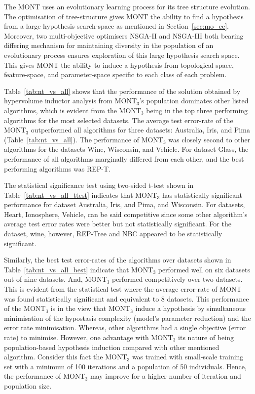 \documentclass[conference]{IEEEtran}
\begin{document}
The MONT uses an evolutionary learning process for its tree structure evolution. The optimisation of tree-structure gives MONT the ability to find a hypothesis from a large hypothesis search-space as mentioned in Section~\ref{sec:mo_ec}. Moreover, two multi-objective optimisers NSGA-II and NSGA-III both bearing differing mechanism for maintaining diversity in the population of an evolutionary process ensures exploration of this large hypothesis search space. This gives MONT the ability to induce a hypothesis from topological-space, feature-space, and parameter-space specific to each class of each problem.

Table~\ref{tab:nt_vs_all} shows that the performance of the solution obtained by hypervolume inductor analysis from MONT$_3$'s population dominates other listed algorithms, which is evident from the MONT$_3$ being in the top three performing algorithms for the most selected datasets. The average test error-rate of the MONT$_3$ outperformed all algorithms for three datasets: Australia, Iris, and Pima (Table~\ref{tab:nt_vs_all}). The performance of MONT$_3$ was closely second to other algorithms for the datasets Wine, Wisconsin, and Vehicle. For dataset Glass, the performance of all algorithms marginally differed from each other, and the best performing algorithms was REP-T. 

The statistical significance test using two-sided t-test shown in Table~\ref{tab:nt_vs_all_ttest} indicates that MONT$_3$ has statistically significant performance for dataset Australia, Iris, and Pima, and Wisconsin. For datasets, Heart, Ionosphere, Vehicle, can be said competitive since some other algorithm's average test error rates were better but not statistically significant. For the dataset, wine, however, REP-Tree and NBC appeared to be statistically significant.  

Similarly, the best test error-rates of the algorithms over datasets shown in Table~\ref{tab:nt_vs_all_best} indicate that MONT$_3$ performed well on six datasets out of nine datasets. And, MONT$_3$ performed competitively over two datasets. This is evident from the statistical test where the average error-rate of MONT was found statistically significant and equivalent to 8 datasets. This performance of the MONT$_3$ is in the view that MONT$_3$ induce a hypothesis by simultaneous minimisation of the hypostasis complexity (model's parameter reduction)  and the error rate minimisation.  Whereas, other algorithms had a single objective (error rate) to minimise. However, one advantage with MONT$_3$ its nature of being population-based hypothesis induction compared with other mentioned algorithm. Consider this fact the MONT$_3$ was trained with small-scale training set with a minimum of 100 iterations and a population of 50 individuals. Hence, the performance of MONT$_3$ may improve for a higher number of iteration and population size.  
\end{document}
